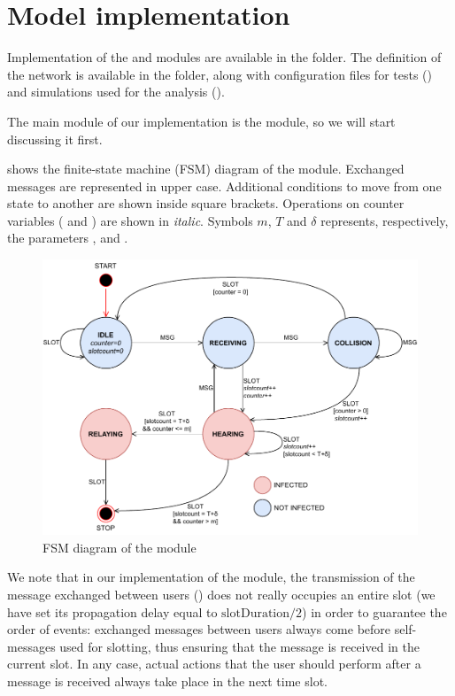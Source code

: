 \section{Model implementation}\label{sec:implementation}

Implementation of the  and  modules are available in the
 folder. The definition of the  network is available
in the  folder, along with configuration files for tests
() and simulations used for the analysis
().

The main module of our implementation is the  module, so we will
start discussing it first.

 shows the finite-state machine (FSM) diagram of the
 module. Exchanged messages are represented in upper case. Additional
conditions to move from one state to another are shown inside square brackets.
Operations on counter variables ( and ) are shown
in \textit{italic}. Symbols \(m\), \(T\) and \(\delta\) represents,
respectively, the parameters ,  and
.

\begin{figure}[htb]
	\centering
	\includegraphics[width=\textwidth]{img/userfsm}
	\caption{FSM diagram of the  module}\label{fig:userfsm}
\end{figure}

We note that in our implementation of the  module, the transmission
of the message exchanged between users () does not really occupies an
entire slot (we have set its propagation delay equal to
\(\textrm{slotDuration}/2\)) in order to guarantee the order of events:
exchanged messages between users always come before self-messages used for
slotting, thus ensuring that the message is received in the current slot. In any
case, actual actions that the user should perform after a message is received
always take place in the next time slot.

